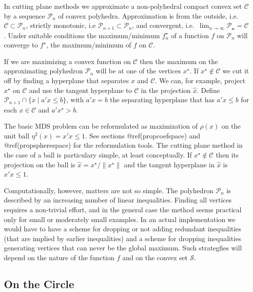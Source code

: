 \documentclass[
  12pt,
  letterpaper,
  DIV=11,
  numbers=noendperiod]{scrreprt}
\theoremstyle{remark}
\begin{document}
In cutting plane methods we approximate a non-polyhedral compact convex
set \(\mathcal{C}\) by a sequence \(\mathcal{P}_n\) of convex polyhedra.
Approximation is from the outside,
i.e.~\(\mathcal{C}\subset\mathcal{P}_n\), strictly monotonic, i.e
\(\mathcal{P}_{n+1}\subset\mathcal{P}_n\), and convergent,
i.e.~\(\lim_{n\rightarrow\infty}\mathcal{P_n}=\mathcal{C}\). Under
suitable conditions the maximum/minimum \(f^\star_n\) of a function
\(f\) on \(\mathcal{P}_n\) will converge to \(f^\star\), the
maximum/minimum of \(f\) on \(\mathcal{C}\).

If we are maximizing a convex function on \(\mathcal{C}\) then the
maximum on the approximating polyhedron \(\mathcal{P}_n\) will be at one
of the vertices \(x^\star\). If \(x^\star\not\in\mathcal{C}\) we cut it
off by finding a hyperplane that separates \(x\) and \(\mathcal{C}\). We
can, for example, project \(x^\star\) on \(\mathcal{C}\) and use the
tangent hyperplane to \(\mathcal{C}\) in the projection \(\hat x\).
Define \(\mathcal{P}_{n+1}\cap\{x\mid a'x\leq b\}\), with \(a'x=b\) the
separating hyperplane that has \(a'x\leq b\) for each
\(x\in\mathcal{C}\) and \(a'x^\star > b\).

The basic MDS problem can be reformulated as maximization of \(\rho(x)\)
on the unit ball \(\eta^2(x)=x'x\leq 1\). See sections
@ref(propcoefspace) and @ref(propspherespace) for the reformulation
tools. The cutting plane method in the case of a ball is particulary
simple, at least conceptually. If \(x^\star\not\in\mathcal{C}\) then its
projection on the ball is \(\hat x=x^\star/\|x^\star\|\) and the tangent
hyperplane in \(\hat x\) is \(\hat x'x\leq 1\).

Computationally, however, matters are not so simple. The polyhedron
\(\mathcal{P}_n\) is described by an increasing number of linear
inequalities. Finding all vertices requires a non-trivial effort, and in
the general case the method seems practical only for small or moderately
small examples. In an actual implementation we would have to have a
scheme for dropping or not adding redundant inequalities (that are
implied by earlier inequalities) and a scheme for dropping inequalities
generating vertices that can never be the global maximum. Such
strategfies will depend on the nature of the function \(f\) and on the
convex set \(\mathcal{S}\).

\subsection{On the Circle}\label{globalcircle}
\end{document}
